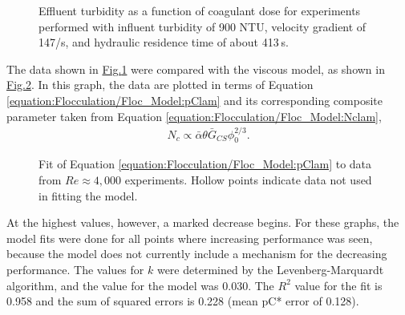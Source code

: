 \documentclass[letterpaper,10pt,english]{sphinxmanual}
\let\sphinxpxdimen\pdfpxdimen\else\newdimen\sphinxpxdimen
\begin{document}
\begin{figure}[htbp]
\centering
\capstart

\noindent\sphinxincludegraphics[width=400\sphinxpxdimen]{{PennockFig2}.png}
\caption{Effluent turbidity as a function of coagulant dose for experiments performed with influent turbidity of 900 NTU, velocity gradient of 147/s, and hydraulic residence time of about 413 s.}\label{\detokenize{Flocculation/Floc_Model:id39}}\label{\detokenize{Flocculation/Floc_Model:figure-pennockfig2}}\end{figure}

The data shown in \hyperref[\detokenize{Flocculation/Floc_Model:figure-pennockfig2}]{Fig.\@ \ref{\detokenize{Flocculation/Floc_Model:figure-pennockfig2}}} were compared with the viscous model, as shown in \hyperref[\detokenize{Flocculation/Floc_Model:figure-pennockfig3}]{Fig.\@ \ref{\detokenize{Flocculation/Floc_Model:figure-pennockfig3}}}.
In this graph, the data are plotted in terms of Equation \eqref{equation:Flocculation/Floc_Model:pClam} and its corresponding composite parameter taken from Equation \eqref{equation:Flocculation/Floc_Model:Nclam},
\begin{equation}\label{equation:Flocculation/Floc_Model:Paramlam}
\begin{split}      N_{c}\propto\bar{\alpha}\theta \bar G_{CS}\phi_0^{2/3}.\end{split}
\end{equation}
\begin{figure}[htbp]
\centering
\capstart

\noindent\sphinxincludegraphics[width=400\sphinxpxdimen]{{PennockFig3}.png}
\caption{Fit of Equation \eqref{equation:Flocculation/Floc_Model:pClam} to data from \(Re\approx 4,000\) experiments. Hollow points indicate data not used in fitting the model.}\label{\detokenize{Flocculation/Floc_Model:id40}}\label{\detokenize{Flocculation/Floc_Model:figure-pennockfig3}}\end{figure}

At the highest values, however, a marked decrease begins. For these graphs, the model fits were done for all points where increasing performance was seen, because the model does not currently include a mechanism for the decreasing performance. The values for \(k\) were determined by the Levenberg-Marquardt algorithm, and the value for the model was 0.030. The \(R^2\) value for the fit is 0.958 and the sum of squared errors is 0.228 (mean pC* error of 0.128).
\end{document}
